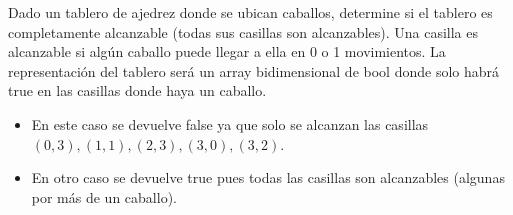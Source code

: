 Dado un tablero de ajedrez donde se ubican caballos, determine si el tablero es completamente alcanzable (todas sus casillas son alcanzables). Una casilla es alcanzable si algún caballo puede llegar a ella en 0 o 1 movimientos. La representación del tablero será un array bidimensional de bool donde solo habrá true en las casillas donde haya un caballo. 
\begin{itemize}
    \item En este caso se devuelve false ya que solo se alcanzan las casillas \( (0,3), (1,1), (2,3),(3,0), (3,2) \).
    \begin{center}
    \end{center}
    \item En otro caso se devuelve true pues todas las casillas son alcanzables (algunas por más de un caballo).
    \begin{center}
\end{center}
\end{itemize}
